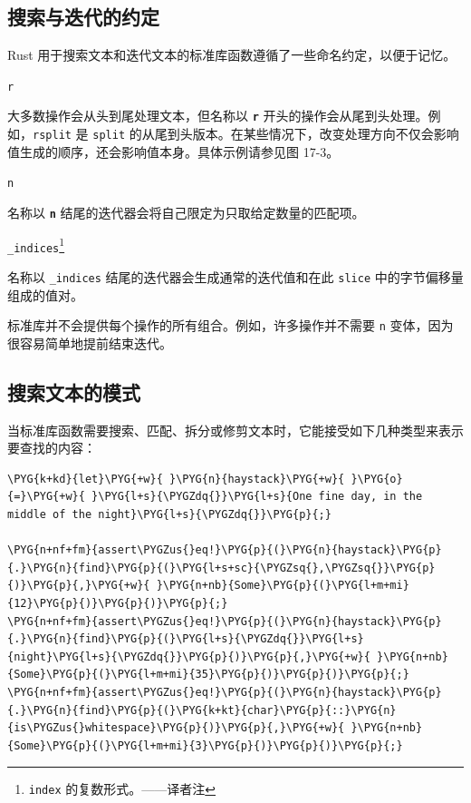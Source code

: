 \subsection{搜索与迭代的约定}

Rust 用于搜索文本和迭代文本的标准库函数遵循了一些命名约定，以便于记忆。

\begin{mySidenote}
\texttt{r}
\end{mySidenote}

大多数操作会从头到尾处理文本，但名称以 \textbf{\texttt{r}} 开头的操作会从尾到头处理。例如，\texttt{rsplit} 是 \texttt{split} 的从尾到头版本。在某些情况下，改变处理方向不仅会影响值生成的顺序，还会影响值本身。具体示例请参见图 17-3。

\begin{mySidenote}
\texttt{n}
\end{mySidenote}

名称以 \textbf{\texttt{n}} 结尾的迭代器会将自己限定为只取给定数量的匹配项。

\begin{mySidenote}
\texttt{\_indices}\footnote{\texttt{index} 的复数形式。——译者注}
\end{mySidenote}

名称以 \texttt{\_indices} 结尾的迭代器会生成通常的迭代值和在此 \texttt{slice} 中的字节偏移量组成的值对。

标准库并不会提供每个操作的所有组合。例如，许多操作并不需要 \texttt{n} 变体，因为很容易简单地提前结束迭代。

\subsection{搜索文本的模式}

当标准库函数需要搜索、匹配、拆分或修剪文本时，它能接受如下几种类型来表示要查找的内容：

\begin{Verbatim}[commandchars=\\\{\},breaklines=true,breakanywhere=true,fontsize=\codefont,xleftmargin=17bp]
\PYG{k+kd}{let}\PYG{+w}{ }\PYG{n}{haystack}\PYG{+w}{ }\PYG{o}{=}\PYG{+w}{ }\PYG{l+s}{\PYGZdq{}}\PYG{l+s}{One fine day, in the middle of the night}\PYG{l+s}{\PYGZdq{}}\PYG{p}{;}

\PYG{n+nf+fm}{assert\PYGZus{}eq!}\PYG{p}{(}\PYG{n}{haystack}\PYG{p}{.}\PYG{n}{find}\PYG{p}{(}\PYG{l+s+sc}{\PYGZsq{},\PYGZsq{}}\PYG{p}{)}\PYG{p}{,}\PYG{+w}{ }\PYG{n+nb}{Some}\PYG{p}{(}\PYG{l+m+mi}{12}\PYG{p}{)}\PYG{p}{)}\PYG{p}{;}
\PYG{n+nf+fm}{assert\PYGZus{}eq!}\PYG{p}{(}\PYG{n}{haystack}\PYG{p}{.}\PYG{n}{find}\PYG{p}{(}\PYG{l+s}{\PYGZdq{}}\PYG{l+s}{night}\PYG{l+s}{\PYGZdq{}}\PYG{p}{)}\PYG{p}{,}\PYG{+w}{ }\PYG{n+nb}{Some}\PYG{p}{(}\PYG{l+m+mi}{35}\PYG{p}{)}\PYG{p}{)}\PYG{p}{;}
\PYG{n+nf+fm}{assert\PYGZus{}eq!}\PYG{p}{(}\PYG{n}{haystack}\PYG{p}{.}\PYG{n}{find}\PYG{p}{(}\PYG{k+kt}{char}\PYG{p}{::}\PYG{n}{is\PYGZus{}whitespace}\PYG{p}{)}\PYG{p}{,}\PYG{+w}{ }\PYG{n+nb}{Some}\PYG{p}{(}\PYG{l+m+mi}{3}\PYG{p}{)}\PYG{p}{)}\PYG{p}{;}
\end{Verbatim}

